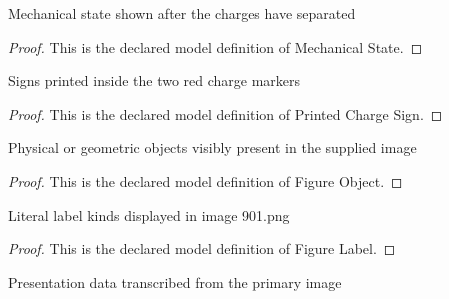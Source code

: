 \begin{definition}
  \label{def:physics:phyx-mini-0901:phyxminiproblems-problemphyxmini0901-mechanicalstate}
  Mechanical state shown after the charges have separated
\end{definition}
\begin{proof}
  This is the declared model definition of Mechanical State.
\end{proof}
\begin{definition}
  \label{def:physics:phyx-mini-0901:phyxminiproblems-problemphyxmini0901-printedchargesign}
  Signs printed inside the two red charge markers
\end{definition}
\begin{proof}
  This is the declared model definition of Printed Charge Sign.
\end{proof}
\begin{definition}
  \label{def:physics:phyx-mini-0901:phyxminiproblems-problemphyxmini0901-figureobject}
  Physical or geometric objects visibly present in the supplied image
\end{definition}
\begin{proof}
  This is the declared model definition of Figure Object.
\end{proof}
\begin{definition}
  \label{def:physics:phyx-mini-0901:phyxminiproblems-problemphyxmini0901-figurelabel}
  Literal label kinds displayed in image 901.png
\end{definition}
\begin{proof}
  This is the declared model definition of Figure Label.
\end{proof}
\begin{definition}
  \label{def:physics:phyx-mini-0901:phyxminiproblems-problemphyxmini0901-chargedpendulumfigure}
  Presentation data transcribed from the primary image
\end{definition}
